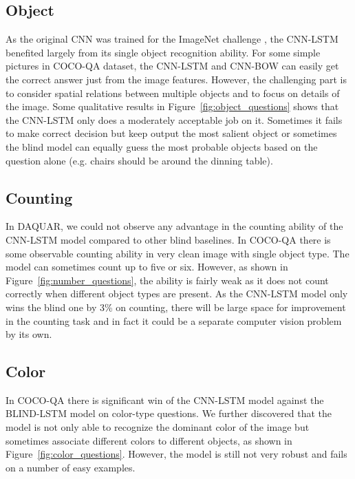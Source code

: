 \documentclass{article}
\renewcommand{\#}[1]{\textbf{#1}}
\begin{document}
\subsection{Object}
As the original CNN was trained for the ImageNet challenge \cite{ilsvrc14}, the CNN-LSTM benefited largely from its single object recognition ability. For some simple pictures in COCO-QA dataset, the CNN-LSTM and CNN-BOW can easily get the correct answer just from the image features. However, the challenging part is to consider spatial relations between multiple objects and to focus on details of the image. Some qualitative results in Figure~\ref{fig:object_questions} shows that the CNN-LSTM only does a moderately acceptable job on it. Sometimes it fails to make correct decision but keep output the most salient object or sometimes the blind model can equally guess the most probable objects based on the question alone (e.g. chairs should be around the dinning table).

\subsection{Counting}
In DAQUAR, we could not observe any advantage in the counting ability of the CNN-LSTM model compared to other blind baselines. In COCO-QA there is some observable counting ability in very clean image with single object type. The model can sometimes count up to five or six. However, as shown in Figure~\ref{fig:number_questions}, the ability is fairly weak as it does not count correctly when different object types are present. As the CNN-LSTM model only wins the blind one by 3\% on counting, there will be large space for improvement in the counting task and in fact it could be a separate computer vision problem by its own.

\subsection{Color}
In COCO-QA there is significant win of the CNN-LSTM model against the BLIND-LSTM model on color-type questions. We further discovered that the model is not only able to recognize the dominant color of the image but sometimes associate different colors to different objects, as shown in Figure~\ref{fig:color_questions}. However, the model is still not very robust and fails on a number of easy examples.
\end{document}
